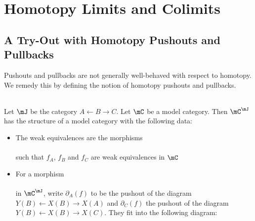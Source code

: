 \documentclass[a4paper]{article}
\begin{document}
\pagebreak
\section{Homotopy Limits and Colimits}
\subsection{A Try-Out with Homotopy Pushouts and Pullbacks}
Pushouts and pullbacks are not generally well-behaved with respect to homotopy. We remedy this by defining the notion of homotopy pushouts and pullbacks. 

\begin{prp}{}{}\\ Let $\mJ$ be the category $A\leftarrow B\rightarrow C$. Let $\mC$ be a model category. Then $\mC^\mJ$ has the structure of a model category with the following data: 
\begin{itemize}
\item The weak equivalences are the morphisms \\
\\
such that $f_A$, $f_B$ and $f_C$ are weak equivalences in $\mC$
\item For a morphism \\
\\ in $\mC^\mJ$, write $\partial_A(f)$ to be the pushout of the diagram $Y(B)\leftarrow X(B)\rightarrow X(A)$ and $\partial_C(f)$ the pushout of the diagram $Y(B)\leftarrow X(B)\rightarrow X(C)$. They fit into the following diagram: \\
\end{itemize}
\end{prp}
\end{document}
